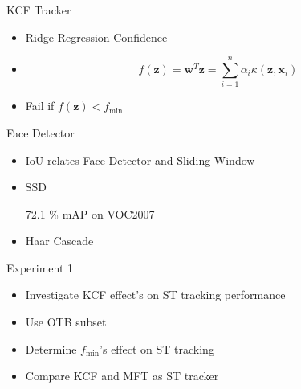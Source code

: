 \documentclass[mathserif, 14pt, xcolor=svgnames]{beamer}
\renewcommand {\cite} {\citep}  %
\begin{document}
\bgroup
\begin{frame}{KCF Tracker \cite{Enriques2014}}
   \begin{itemize}
     \setlength\itemsep{1.2em}
     \item \hspace{0pt}
       \pause Ridge Regression Confidence
     \item \hspace{0pt}
       \pause 
        \begin{equation*}
          f(\pmb{z}) = \pmb{w}^T\pmb{z} = \sum_{i = 1}^n \alpha_i \kappa(\pmb{z}, \pmb{x}_i)   
        \end{equation*}
     \item \hspace{0pt}
       \pause Fail if $f(\pmb{z}) < f_{\text{min}}$
    \end{itemize}
\end{frame}
\egroup


\bgroup

\begin{frame}{Face Detector}
   \begin{itemize}
     \setlength\itemsep{1.2em}
     \item \hspace{0pt}
       \pause IoU relates Face Detector and Sliding Window
     \item \hspace{0pt}
       \pause SSD \cite{liu2016}
       \begin{itemize}
           72.1 \% mAP on VOC2007
       \end{itemize}
     \item \hspace{0pt}
       \pause Haar Cascade \cite{viola2001}
    \end{itemize}
\end{frame}

\egroup

\bgroup
\begin{frame}{Experiment 1}

    \begin{itemize}
      \setlength\itemsep{1.3em}
       \item \hspace{0pt}
         \pause Investigate KCF effect's on ST tracking performance
       \item \hspace{0pt}
         \pause Use OTB subset \cite{OTBDataset}
       \item \hspace{0pt}
         \pause Determine $f_\text{min}$'s effect on ST tracking
       \item \hspace{0pt}
         \pause Compare KCF and MFT as ST tracker
    \end{itemize}
\end{frame}
\egroup
\end{document}
